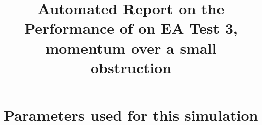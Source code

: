 \documentclass[11pt,a4paper]{article}%
\begin{document}
 

\title{Automated Report on the Performance of \anuga{} on EA Test 3, momentum over a small obstruction}
\maketitle




\section{Parameters used for this simulation}






\end{document}
